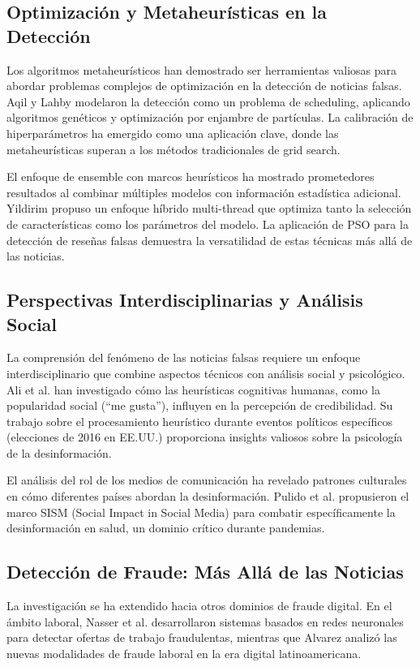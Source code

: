 \subsection{Optimización y Metaheurísticas en la Detección}
Los algoritmos metaheurísticos han demostrado ser herramientas valiosas para abordar problemas complejos de optimización en la detección de noticias falsas. Aqil y Lahby \cite{aqil2021modeling} modelaron la detección como un problema de scheduling, aplicando algoritmos genéticos y optimización por enjambre de partículas. La calibración de hiperparámetros \cite{bacanin2023benefits, hurtado2024calibracion} ha emergido como una aplicación clave, donde las metaheurísticas superan a los métodos tradicionales de grid search.

El enfoque de ensemble con marcos heurísticos \cite{das2022heuristic} ha mostrado prometedores resultados al combinar múltiples modelos con información estadística adicional. Yildirim \cite{yildirim2023novel} propuso un enfoque híbrido multi-thread que optimiza tanto la selección de características como los parámetros del modelo. La aplicación de PSO para la detección de reseñas falsas \cite{deshai2023unmasking} demuestra la versatilidad de estas técnicas más allá de las noticias.

\subsection{Perspectivas Interdisciplinarias y Análisis Social}
La comprensión del fenómeno de las noticias falsas requiere un enfoque interdisciplinario que combine aspectos técnicos con análisis social y psicológico. Ali et al. \cite{ali2021fake, ali2020posttruth} han investigado cómo las heurísticas cognitivas humanas, como la popularidad social (``me gusta''), influyen en la percepción de credibilidad. Su trabajo sobre el procesamiento heurístico durante eventos políticos específicos (elecciones de 2016 en EE.UU.) proporciona insights valiosos sobre la psicología de la desinformación.

El análisis del rol de los medios de comunicación \cite{carcamo2021fake, perez2020fake} ha revelado patrones culturales en cómo diferentes países abordan la desinformación. Pulido et al. \cite{pulido2020new} propusieron el marco SISM (Social Impact in Social Media) para combatir específicamente la desinformación en salud, un dominio crítico durante pandemias.

\subsection{Detección de Fraude: Más Allá de las Noticias}
La investigación se ha extendido hacia otros dominios de fraude digital. En el ámbito laboral, Nasser et al. \cite{nasser2021online} desarrollaron sistemas basados en redes neuronales para detectar ofertas de trabajo fraudulentas, mientras que Alvarez \cite{alvarez2021fraude} analizó las nuevas modalidades de fraude laboral en la era digital latinoamericana.

